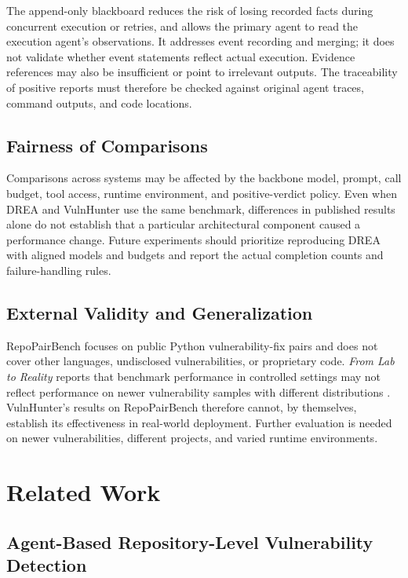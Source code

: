 \documentclass[10pt,a4paper]{article}
\begin{document}
The append-only blackboard reduces the risk of losing recorded facts during concurrent execution or retries, and allows the primary agent to read the execution agent's observations. It addresses event recording and merging; it does not validate whether event statements reflect actual execution. Evidence references may also be insufficient or point to irrelevant outputs. The traceability of positive reports must therefore be checked against original agent traces, command outputs, and code locations.

\subsection{Fairness of Comparisons}

Comparisons across systems may be affected by the backbone model, prompt, call budget, tool access, runtime environment, and positive-verdict policy. Even when DREA and VulnHunter use the same benchmark, differences in published results alone do not establish that a particular architectural component caused a performance change. Future experiments should prioritize reproducing DREA with aligned models and budgets and report the actual completion counts and failure-handling rules.

\subsection{External Validity and Generalization}

RepoPairBench focuses on public Python vulnerability-fix pairs and does not cover other languages, undisclosed vulnerabilities, or proprietary code. \emph{From Lab to Reality} reports that benchmark performance in controlled settings may not reflect performance on newer vulnerability samples with different distributions \cite{lu2025lab}. VulnHunter's results on RepoPairBench therefore cannot, by themselves, establish its effectiveness in real-world deployment. Further evaluation is needed on newer vulnerabilities, different projects, and varied runtime environments.

\section{Related Work}

\subsection{Agent-Based Repository-Level Vulnerability Detection}
\end{document}
